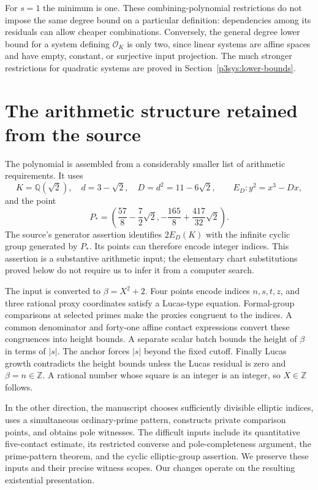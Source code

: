 \documentclass[11pt]{article}
\theoremstyle{definition}
\newcommand{\Q}{\mathbb Q}
\newcommand{\Z}{\mathbb Z}
\begin{document}
For $s=1$ the minimum is one.  These combining-polynomial
restrictions do not impose the same degree bound on a
particular definition: dependencies among its residuals can
allow cheaper combinations.  Conversely, the general degree
lower bound for a system defining $\mathcal O_K$ is only two,
since linear systems are affine spaces and have empty, constant,
or surjective input projection.  The much stronger restrictions
for quadratic systems are proved in
Section~\ref{p3sys:lower-bounds}.


\section{The arithmetic structure retained from the source}
\label{sec:source-structure}

The polynomial is assembled from a considerably smaller list of
arithmetic requirements. It uses
\[
 K=\Q(\sqrt2),\quad d=3-\sqrt2,\quad D=d^2=11-6\sqrt2,
 \qquad E_D:y^2=x^3-Dx,
\]
and the point
\[
 P_*=\left(\frac{57}{8}-\frac72\sqrt2,
 -\frac{165}{8}+\frac{417}{32}\sqrt2\right).
\]
The source's generator assertion identifies $2E_D(K)$ with the
infinite cyclic group generated by $P_*$. Its points can therefore
encode integer indices. This assertion is a substantive arithmetic
input; the elementary chart substitutions proved below do not require
us to infer it from a computer search.

The input is converted to $\beta=X^2+2$. Four points encode indices
$n,s,t,z$, and three rational proxy coordinates satisfy a Lucas-type
equation. Formal-group comparisons at selected primes make the proxies
congruent to the indices. A common denominator and forty-one affine
contact expressions convert these congruences into height bounds.
A separate scalar batch bounds the height of $\beta$ in terms of
$|s|$. The anchor forces $|s|$ beyond the fixed cutoff. Finally Lucas
growth contradicts the height bounds unless the Lucas residual is zero
and $\beta=n\in\Z$. A rational number whose square is an integer
is an integer, so $X\in\Z$ follows.

In the other direction, the manuscript chooses sufficiently divisible
elliptic indices, uses a simultaneous ordinary-prime pattern, constructs
private comparison points, and obtains pole witnesses. The difficult
inputs include its quantitative five-contact estimate, its restricted
converse and pole-completeness argument, the prime-pattern theorem,
and the cyclic elliptic-group assertion. We preserve these inputs and
their precise witness scopes. Our changes operate on the resulting
existential presentation.
\end{document}
